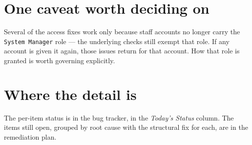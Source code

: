\documentclass[11pt]{article}
\begin{document}
\section{One caveat worth deciding on}
Several of the access fixes work only because staff accounts no longer carry the \texttt{System~Manager}
role --- the underlying checks still exempt that role. If any account is given it again, those issues
return for that account. How that role is granted is worth governing explicitly.

\section{Where the detail is}
The per-item status is in the bug tracker, in the \emph{Today's Status} column. The items still open,
grouped by root cause with the structural fix for each, are in the remediation plan.
\end{document}
